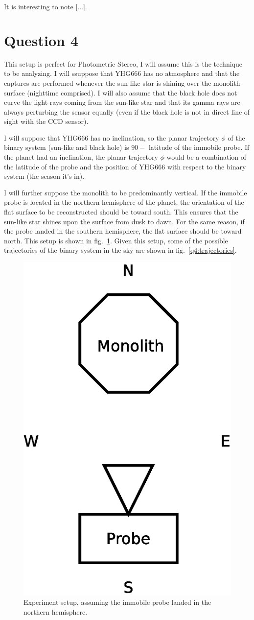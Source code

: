 \documentclass{report}
\begin{document}
It is interesting to note [...].

\section{Question 4}

This setup is perfect for Photometric Stereo, I will assume this is the technique to be analyzing. I will ssuppose that YHG666 has no atmosphere and that the captures are performed whenever the sun-like star is shining over the monolith surface (nighttime comprised). I will also assume that the black hole does not curve the light rays coming from the sun-like star and that its gamma rays are always perturbing the sensor equally (even if the black hole is not in direct line of sight with the CCD sensor).

I will suppose that YHG666 has no inclination, so the planar trajectory $\phi$ of the binary system (sun-like and black hole) is $90 -$ latitude of the immobile probe. If the planet had an inclination, the planar trajectory $\phi$ would be a combination of the latitude of the probe and the position of YHG666 with respect to the binary system (the season it's in).

I will further suppose the monolith to be predominantly vertical. If the immobile probe is located in the northern hemisphere of the planet, the orientation of the flat surface to be reconstructed should be toward south. This ensures that the sun-like star shines upon the surface from dusk to dawn. For the same reason, if the probe landed in the southern hemisphere, the flat surface should be toward north. This setup is shown in fig.~\ref{q4:setup}. Given this setup, some of the possible trajectories of the binary system in the sky are shown in fig.~\ref{q4:trajectories}.

\begin{figure}
  \centering
  \includegraphics[width=0.25\linewidth]{q4_setup.eps}
  \caption[Setup of the experiment]
   {Experiment setup, assuming the immobile probe landed in the northern hemisphere.}
  \label{q4:setup}
\end{figure}
\end{document}

